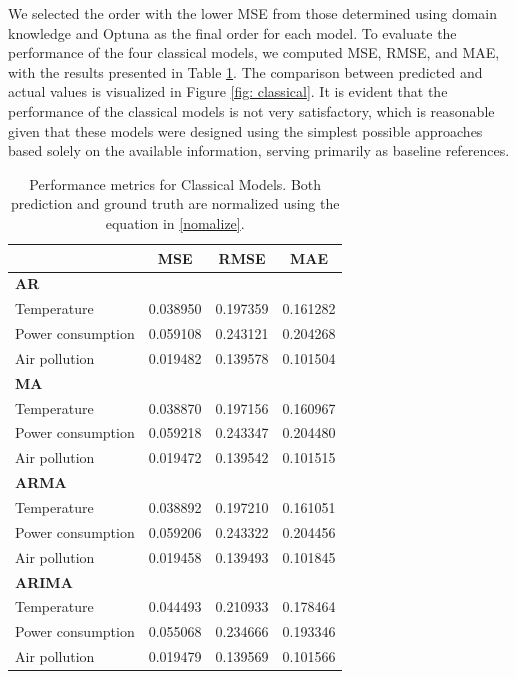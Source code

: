 \documentclass{scrartcl}
\begin{document}
We selected the order with the lower MSE from those determined using domain knowledge and Optuna as the final order for each model. To evaluate the performance of the four classical models, we computed MSE, RMSE, and MAE, with the results presented in Table \ref{tab:classical_metric}. The comparison between predicted and actual values is visualized in Figure \ref{fig: classical}. It is evident that the performance of the classical models is not very satisfactory, which is reasonable given that these models were designed using the simplest possible approaches based solely on the available information, serving primarily as baseline references.
\begin{table}[h!]
\centering
\begin{tabular}{@{}lccc@{}}
\toprule
\textbf{}               & \textbf{MSE} & \textbf{RMSE} & \textbf{MAE} \\ \midrule
\textbf{AR}             &              &               &              \\
Temperature             & 0.038950     & 0.197359      & 0.161282     \\
Power consumption       & 0.059108     & 0.243121      & 0.204268     \\
Air pollution           & 0.019482     & 0.139578      & 0.101504     \\ \midrule
\textbf{MA}             &              &               &              \\
Temperature             & 0.038870     & 0.197156      & 0.160967    \\
Power consumption       & 0.059218     & 0.243347      & 0.204480     \\
Air pollution           & 0.019472     & 0.139542      & 0.101515     \\ \midrule
\textbf{ARMA}           &              &               &              \\
Temperature             & 0.038892     & 0.197210      & 0.161051     \\
Power consumption       & 0.059206     & 0.243322      & 0.204456     \\
Air pollution           & 0.019458     & 0.139493      & 0.101845      \\ \midrule
\textbf{ARIMA}          &              &               &              \\
Temperature             & 0.044493     & 0.210933      & 0.178464     \\
Power consumption       & 0.055068     & 0.234666      & 0.193346     \\
Air pollution           & 0.019479     & 0.139569      & 0.101566       \\ \bottomrule
\end{tabular}
\caption{Performance metrics for Classical Models. Both prediction and ground truth are normalized using the equation in \ref{nomalize}.}
\label{tab:classical_metric}
\end{table}
\end{document}
